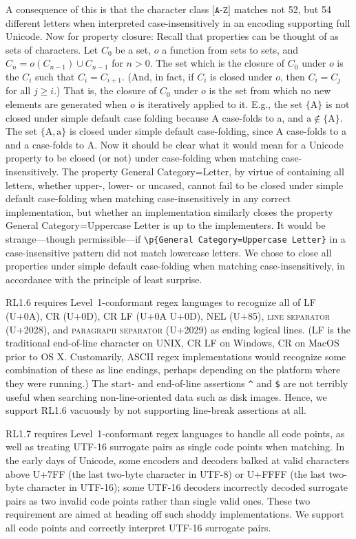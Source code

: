 \documentclass[5p,final,number,sort&compress]{elsarticle}
\newcommand{\re}[1]{\texttt{#1}}
\newcommand*{\whack}{\textbackslash}
\begin{document}
A consequence of this is that the character class $\re{[A-Z]}$ matches not 52, but 54 different letters when interpreted case-insensitively in an encoding supporting full Unicode. Now for property closure: Recall that properties can be thought of as sets of characters. Let $C_0$ be a set, $o$ a function from sets to sets, and $C_n = o(C_{n-1}) \cup C_{n-1}$ for $n > 0$. The set which is the closure of $C_0$ under $o$ is the $C_i$ such that $C_i = C_{i+1}$. (And, in fact, if $C_i$ is closed under $o$, then $C_i = C_j$ for all $j \ge i$.) That is, the closure of $C_0$ under $o$ is the set from which no new elements are generated when $o$ is iteratively applied to it. E.g., the set $\{\mathrm{A}\}$ is not closed under simple default case folding because A case-folds to a, and $\mathrm{a} \notin \{\mathrm{A}\}$. The set $\{\mathrm{A}, \mathrm{a}\}$ is closed under simple default case-folding, since A case-folds to a and a case-folds to A. Now it should be clear what it would mean for a Unicode property to be closed (or not) under case-folding when matching case-insensitively. The property General Category=Letter, by virtue of containing all letters, whether upper-, lower- or uncased, cannot fail to be closed under simple default case-folding when matching case-insensitively in any correct implementation, but whether an implementation similarly closes the property General Category=Uppercase Letter is up to the implementers. It would be strange---though permissible---if \re{\whack p\{General Category=Uppercase Letter\}} in a case-insensitive pattern did not match lowercase letters. We chose to close all properties under simple default case-folding when matching case-insensitively, in accordance with the principle of least surprise.

RL1.6 requires Level~1-conformant regex languages to recognize all of LF (U+0A), CR (U+0D), CR LF (U+0A U+0D), NEL (U+85), \textsc{line separator} (U+2028), and \textsc{paragraph separator} (U+2029) as ending logical lines. (LF is the traditional end-of-line character on UNIX, CR LF on Windows, CR on MacOS prior to OS X. Customarily, ASCII regex implementations would recognize some combination of these as line endings, perhaps depending on the platform where they were running.) The start- and end-of-line assertions \re{\textasciicircum} and \re{\$} are not terribly useful when searching non-line-oriented data such as disk images. Hence, we support RL1.6 vacuously by not supporting line-break assertions at all.

RL1.7 requires Level~1-conformant regex languages to handle all code points, as well as treating UTF-16 surrogate pairs as single code points when matching. In the early days of Unicode, some encoders and decoders balked at valid characters above U+7FF (the last two-byte character in UTF-8) or U+FFFF (the last two-byte character in UTF-16); some UTF-16 decoders incorrectly decoded surrogate pairs as two invalid code points rather than single valid ones. These two requirement are aimed at heading off such shoddy implementations. We support all code points and correctly interpret UTF-16 surrogate pairs. 
\end{document}
